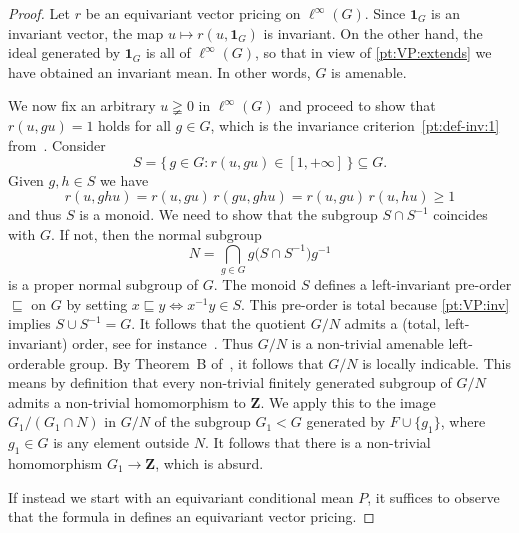 \documentclass[11pt]{amsart}
\numberwithin{equation}{section}
\theoremstyle{definition}
\theoremstyle{definition}
\newcommand*{\ZZ}{\mathbf{Z}}
\newcommand*{\se}{\subseteq}
\newcommand*{\inv}{^{-1}}
\newcommand*{\one}{\boldsymbol{1}}
\begin{document}
\begin{proof}
Let $r$ be an equivariant vector pricing on $\ell^\infty(G)$. Since $\one_G$ is an invariant vector, the map $u\mapsto r(u, \one_G)$ is invariant. On the other hand, the ideal generated by $\one_G$ is all of $\ell^\infty(G)$, so that in view of \ref{pt:VP:extends} we have obtained an invariant mean. In other words, $G$ is amenable.

We now fix an arbitrary $u\gneqq 0$ in $\ell^\infty(G)$ and proceed to show that $r(u, g u)=1$ holds for all $g\in G$, which is the invariance criterion~\ref{pt:def-inv:1} from~. Consider
\begin{equation*}
S = \big\{ \, g\in G : r(u, g u) \in[1, +\infty]\, \big\} \se G.
\end{equation*}
Given $g,h\in S$ we have
\begin{equation*}
r(u, gh u) = r(u, g u)\, r(g u, gh u) = r(u, g u)\, r(u, h u) \geq 1
\end{equation*}
and thus $S$ is a monoid. We need to show that the subgroup $S \cap S\inv$ coincides with $G$. If not, then the normal subgroup
\begin{equation*}
N = \bigcap_{g\in G} g \big( S \cap S\inv \big) g\inv
\end{equation*}
is a proper normal subgroup of $G$. The monoid $S$ defines a left-invariant pre-order $\sqsubseteq$ on $G$ by setting $x\sqsubseteq y\Leftrightarrow x\inv y\in S$. This pre-order is total because \ref{pt:VP:inv} implies $S \cup S\inv=G$. It follows that the quotient $G/N$ admits a (total, left-invariant) order, see for instance~\cite[Ex.~1.1.8]{Deroin-Navas-rivas_to-appear}. Thus $G/N$ is a non-trivial amenable left-orderable group. By Theorem~B of~\cite{Witte_amen}, it follows that $G/N$ is locally indicable. This means by definition that every non-trivial finitely generated subgroup of $G/N$ admits a non-trivial homomorphism to $\ZZ$. We apply this to the image $G_1/(G_1\cap N)$ in $G/N$ of the subgroup $G_1<G$ generated by $F\cup\{g_1\}$, where $g_1\in G$ is any element outside $N$. It follows that there is a non-trivial homomorphism $G_1\to\ZZ$, which is absurd.

If instead we start with an equivariant conditional mean $P$, it suffices to observe that the formula in  defines an equivariant vector pricing.
\end{proof}
\end{document}
